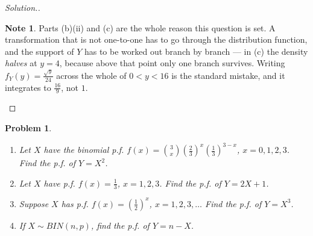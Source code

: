 \documentclass[12pt,a4paper]{report}
\theoremstyle{definition}
\newtheorem{note}[thm]{Note}
\theoremstyle{plain}
\newtheorem{problemx}{Problem}[section]
\newenvironment{problem}{\begin{problemx}}{\end{problemx}}
\newenvironment{solution}
  {\renewcommand{\qedsymbol}{}\begin{proof}[\textit{Solution}.]}
  {\end{proof}}
\begin{document}
\begin{solution}
\begin{note}
Parts (b)(ii) and (c) are the whole reason this question is set. A transformation
that is not one-to-one has to go through the distribution function, and the
support of $Y$ has to be worked out branch by branch --- in (c) the density
\emph{halves} at $y=4$, because above that point only one branch survives.
Writing $f_Y(y)=\frac{\sqrt y}{24}$ across the whole of $0<y<16$ is the standard
mistake, and it integrates to $\frac{16}{9}$, not $1$.
\end{note}
\end{solution}

\begin{problem}
\begin{enumerate}
\item[(a).] Let $X$ have the binomial p.f.
$f(x)=\binom{3}{x}\left(\frac23\right)^x\left(\frac13\right)^{3-x}$, $x=0,1,2,3$.
Find the p.f. of $Y=X^2$.
\item[(b).] Let $X$ have p.f. $f(x)=\frac13$, $x=1,2,3$. Find the p.f. of
$Y=2X+1$.
\item[(c).] Suppose $X$ has p.f. $f(x)=\left(\frac12\right)^x$, $x=1,2,3,\ldots$
Find the p.f. of $Y=X^3$.
\item[(d).] If $X\sim BIN(n,p)$, find the p.f. of $Y=n-X$.
\end{enumerate}
\end{problem}
\end{document}
